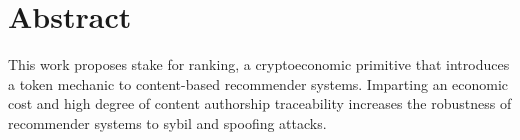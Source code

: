 \section{Abstract}

This work proposes stake for ranking, a cryptoeconomic primitive that introduces a token mechanic to content-based recommender systems. Imparting an economic cost and high degree of content authorship traceability increases the robustness of recommender systems to sybil and spoofing attacks. 